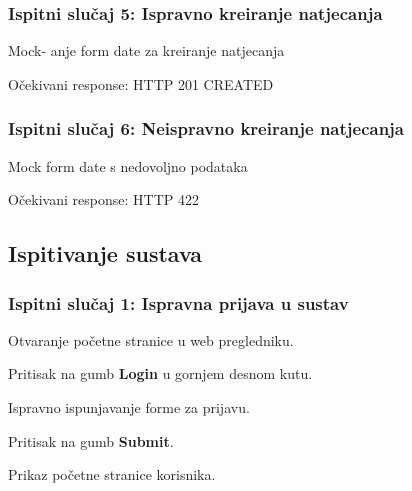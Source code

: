 			\subsubsection{Ispitni slučaj 5: Ispravno kreiranje natjecanja}
				\begin{packed_item}
					\item Mock- anje form date za kreiranje natjecanja
					\item Očekivani response: HTTP 201 CREATED
				\end{packed_item}
				
			\subsubsection{Ispitni slučaj 6: Neispravno kreiranje natjecanja}
				\begin{packed_item}
					\item Mock form date s nedovoljno podataka
					\item Očekivani response: HTTP 422
				\end{packed_item}
				
			\eject
			
			
			\subsection{Ispitivanje sustava}
			
			\subsubsection{Ispitni slučaj 1: Ispravna prijava u sustav}
			
			
			\begin{packed_enum}
				
				\item  Otvaranje početne stranice u web pregledniku.
				\item  Pritisak na gumb \textbf{Login} u gornjem desnom kutu.
				\item  Ispravno ispunjavanje forme za prijavu.
				\item  Pritisak na gumb \textbf{Submit}. 
				
			\end{packed_enum}
			
			\begin{packed_enum}
				
				\item  Prikaz početne stranice korisnika. 
				
			\end{packed_enum}
			
